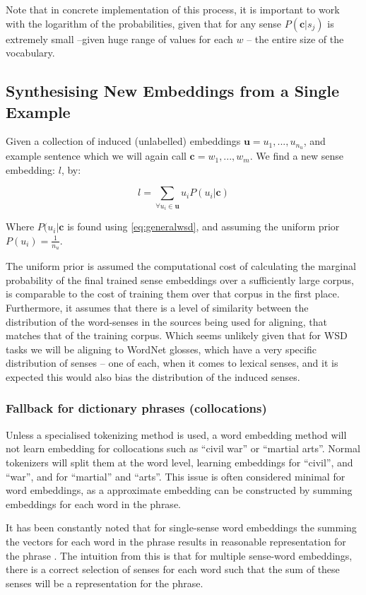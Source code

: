 \documentclass{sig-alternate}
\renewcommand{\c}{\mathbf{c}}
\renewcommand{\u}{\mathbf{u}}
\begin{document}
Note that in concrete implementation of this process, it is important to work with the logarithm of the probabilities, given that for any sense $P(\c|s_j)$ is extremely small --given huge range of values for each $w$ -- the entire size of the vocabulary.


\subsection{Synthesising New Embeddings from a Single Example}

Given a collection of induced (unlabelled) embeddings $\u={u_1,...,u_{n_u}}$, and example sentence which we will again call $\c={w_1,...,w_m}$. We find a new sense embedding: $l$, by: 

\begin{equation} \label{eq:synth}
l=\sum_{\forall u_i \in \u} u_iP(u_i|\c)
\end{equation}

Where $P(u_i|\c$ is found using \cref{eq:generalwsd}, and assuming the uniform prior $P(u_i)=\frac{1}{n_u}$.

The uniform prior is assumed the computational cost of calculating the marginal probability of the final trained sense embeddings over a sufficiently large corpus, is comparable to the cost of training them over that corpus in the first place. Furthermore, it assumes that there is a level of similarity between the distribution of the word-senses in the sources being used for aligning, that matches that of the training corpus. Which seems unlikely given that for WSD tasks we will be aligning to WordNet glosses, which have a very specific distribution of senses -- one of each, when it comes to lexical senses, and it is expected this would also bias the distribution of the induced senses.

\subsubsection {Fallback for dictionary phrases (collocations)}
Unless a specialised tokenizing method is used, a word embedding method will not learn embedding for collocations such as ``civil war'' or ``martial arts''. Normal tokenizers will split them at the word level, learning embeddings for ``civil'', and ``war'', and for ``martial'' and ``arts''. This issue is often considered minimal for word embeddings, as a approximate embedding can be constructed by summing embeddings for each word  in the phrase.

It has been constantly noted that for single-sense word embeddings the summing the vectors for each word in the phrase results in reasonable representation for the phrase  \parencite{mikolovSkip} . The intuition from this is that for multiple sense-word embeddings, there is a correct selection of senses for each word such that the sum of these senses will be a representation for the phrase.
\end{document}
